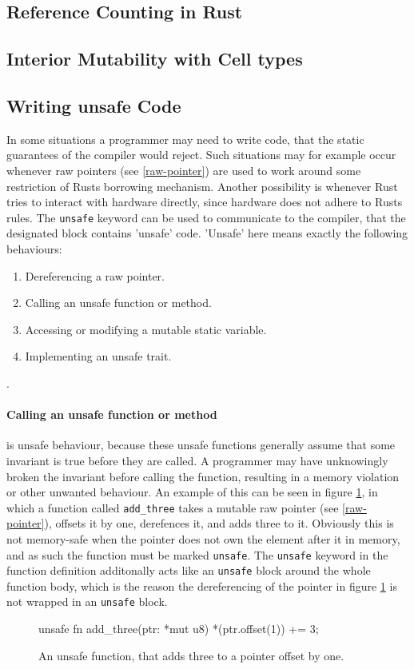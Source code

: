 \documentclass[twocolumn]{article}
\begin{document}
\subsection{Reference Counting in Rust}
\subsection{Interior Mutability with Cell types}
\subsection{Writing unsafe Code}
\label{unsafe}
In some situations a programmer may need to write code, that the static guarantees of the compiler would reject.
Such situations may for example occur whenever raw pointers (see \ref{raw-pointer}) are used to work around some restriction of Rusts borrowing mechanism.
Another possibility is whenever Rust tries to interact with hardware directly, since hardware does not adhere to Rusts rules.
The \texttt{unsafe} keyword can be used to communicate to the compiler, that the designated block contains 'unsafe' code.
'Unsafe' here means exactly the following behaviours:
\begin{enumerate}
        \item Dereferencing a raw pointer.
        \item Calling an unsafe function or method.
        \item Accessing or modifying a mutable static variable.
        \item Implementing an unsafe trait.
\end{enumerate}
\cite{RustBook-Unsafe}.
\paragraph{Calling an unsafe function or method} is unsafe behaviour, because these unsafe functions generally assume that some invariant is true before they are called.
A programmer may have unknowingly broken the invariant before calling the function, resulting in a memory violation or other unwanted behaviour.
An example of this can be seen in figure \ref{unsafe-function}, in which a function called \texttt{add_three} takes a mutable raw pointer (see \ref{raw-pointer}), offsets it by one, derefences it, and adds three to it.
Obviously this is not memory-safe when the pointer does not own the element after it in memory, and as such the function must be marked \texttt{unsafe}.
The \texttt{unsafe} keyword in the function definition additonally acts like an \texttt{unsafe} block around the whole function body, which is the reason the dereferencing of the pointer in figure \ref{unsafe-function} is not wrapped in an \texttt{unsafe} block.
\begin{figure}
\begin{rustcode}
unsafe fn add_three(ptr: *mut u8) {
        *(ptr.offset(1)) += 3;
}
\end{rustcode}
\vspace{-2em}
\caption{An unsafe function, that adds three to a pointer offset by one.}
\label{unsafe-function}
\end{figure}
\end{document}
